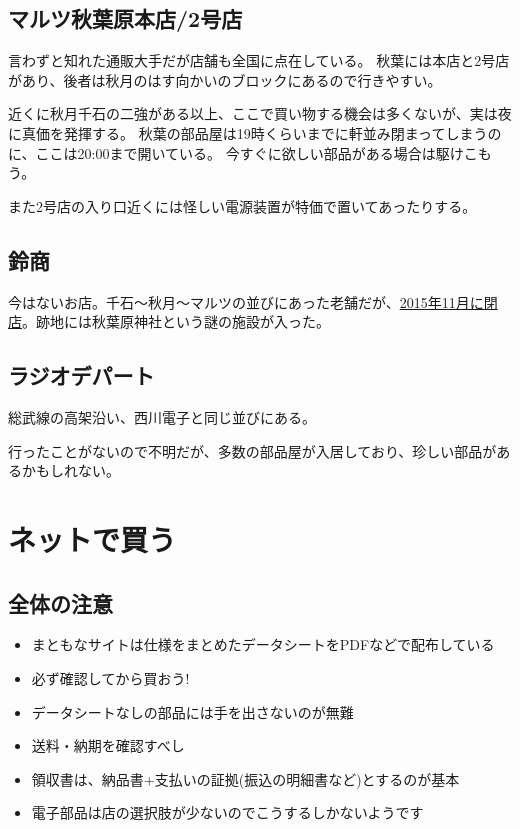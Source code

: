 \documentclass[letterpaper,10pt,dvipdfmx]{sphinxmanual}
\begin{document}
\subsection{マルツ秋葉原本店/2号店}
\label{\detokenize{begginers/buy_parts:id9}}
言わずと知れた通販大手だが店舗も全国に点在している。
秋葉には本店と2号店があり、後者は秋月のはす向かいのブロックにあるので行きやすい。

近くに秋月千石の二強がある以上、ここで買い物する機会は多くないが、実は夜に真価を発揮する。
秋葉の部品屋は19時くらいまでに軒並み閉まってしまうのに、ここは20:00まで開いている。
今すぐに欲しい部品がある場合は駆けこもう。

また2号店の入り口近くには怪しい電源装置が特価で置いてあったりする。


\subsection{鈴商}
\label{\detokenize{begginers/buy_parts:id10}}
今はないお店。千石〜秋月〜マルツの並びにあった老舗だが、\href{http://rocketnews24.com/2015/11/27/671666/}{2015年11月に閉店}。跡地には秋葉原神社という謎の施設が入った。


\subsection{ラジオデパート}
\label{\detokenize{begginers/buy_parts:id11}}
総武線の高架沿い、西川電子と同じ並びにある。

行ったことがないので不明だが、多数の部品屋が入居しており、珍しい部品があるかもしれない。


\section{ネットで買う}
\label{\detokenize{begginers/buy_parts:id12}}

\subsection{全体の注意}
\label{\detokenize{begginers/buy_parts:id13}}\begin{itemize}
\item {} 
まともなサイトは仕様をまとめたデータシートをPDFなどで配布している

\item {} 
必ず確認してから買おう!

\item {} 
データシートなしの部品には手を出さないのが無難

\item {} 
送料・納期を確認すべし

\item {} 
領収書は、納品書+支払いの証拠(振込の明細書など)とするのが基本

\item {} 
電子部品は店の選択肢が少ないのでこうするしかないようです

\end{itemize}
\end{document}
